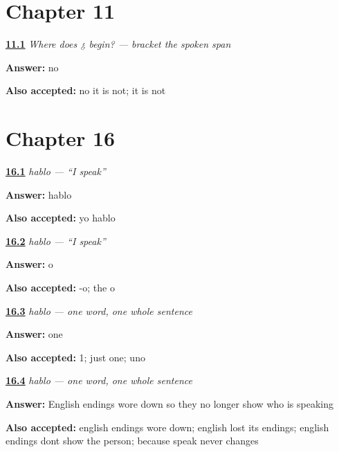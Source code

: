 \section*{Chapter 11}

\noindent\begin{minipage}[t]{\linewidth}
\raggedright
\hyperlink{review-ES-W03-question-span-roberto-outside}{\textbf{11.1}} \emph{Where does ¿ begin? — bracket the spoken span}\par
\small \textbf{Answer:} no\par
\footnotesize \textbf{Also accepted:} no it is not; it is not
\end{minipage}\par\medskip

\section*{Chapter 16}

\noindent\begin{minipage}[t]{\linewidth}
\raggedright
\hyperlink{review-ES-C06-hablo-form}{\textbf{16.1}} \emph{hablo — \textquotedblleft{}I speak\textquotedblright{}}\par
\small \textbf{Answer:} hablo\par
\footnotesize \textbf{Also accepted:} yo hablo
\end{minipage}\par\medskip

\noindent\begin{minipage}[t]{\linewidth}
\raggedright
\hyperlink{review-ES-C06-hablo-ending}{\textbf{16.2}} \emph{hablo — \textquotedblleft{}I speak\textquotedblright{}}\par
\small \textbf{Answer:} o\par
\footnotesize \textbf{Also accepted:} -o; the o
\end{minipage}\par\medskip

\noindent\begin{minipage}[t]{\linewidth}
\raggedright
\hyperlink{review-ES-C06-pro-drop-count}{\textbf{16.3}} \emph{hablo — one word, one whole sentence}\par
\small \textbf{Answer:} one\par
\footnotesize \textbf{Also accepted:} 1; just one; uno
\end{minipage}\par\medskip

\noindent\begin{minipage}[t]{\linewidth}
\raggedright
\hyperlink{review-ES-C06-pro-drop-why}{\textbf{16.4}} \emph{hablo — one word, one whole sentence}\par
\small \textbf{Answer:} English endings wore down so they no longer show who is speaking\par
\footnotesize \textbf{Also accepted:} english endings wore down; english lost its endings; english endings dont show the person; because speak never changes
\end{minipage}\par\medskip


